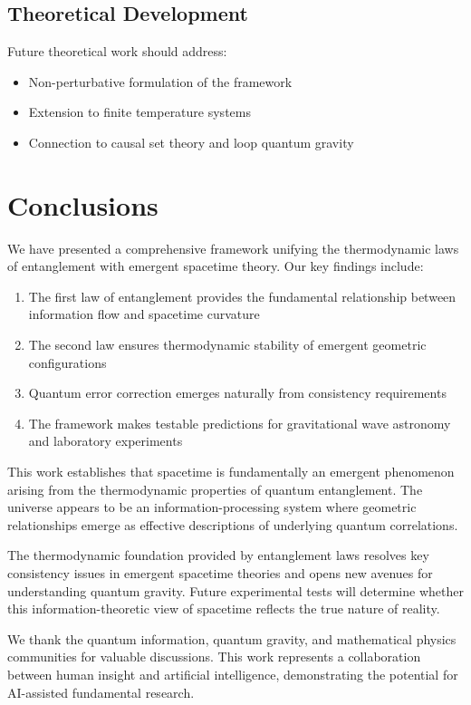 \documentclass[twocolumn,showpacs,preprintnumbers,amsmath,amssymb,aps]{revtex4-1}
\begin{document}
\subsection{Theoretical Development}

Future theoretical work should address:
\begin{itemize}
\item Non-perturbative formulation of the framework
\item Extension to finite temperature systems
\item Connection to causal set theory and loop quantum gravity
\end{itemize}

\section{Conclusions}

We have presented a comprehensive framework unifying the thermodynamic laws of entanglement with emergent spacetime theory. Our key findings include:

\begin{enumerate}
\item The first law of entanglement provides the fundamental relationship between information flow and spacetime curvature
\item The second law ensures thermodynamic stability of emergent geometric configurations
\item Quantum error correction emerges naturally from consistency requirements
\item The framework makes testable predictions for gravitational wave astronomy and laboratory experiments
\end{enumerate}

This work establishes that spacetime is fundamentally an emergent phenomenon arising from the thermodynamic properties of quantum entanglement. The universe appears to be an information-processing system where geometric relationships emerge as effective descriptions of underlying quantum correlations.

The thermodynamic foundation provided by entanglement laws resolves key consistency issues in emergent spacetime theories and opens new avenues for understanding quantum gravity. Future experimental tests will determine whether this information-theoretic view of spacetime reflects the true nature of reality.

\begin{acknowledgments}
We thank the quantum information, quantum gravity, and mathematical physics communities for valuable discussions. This work represents a collaboration between human insight and artificial intelligence, demonstrating the potential for AI-assisted fundamental research.
\end{acknowledgments}
\end{document}
